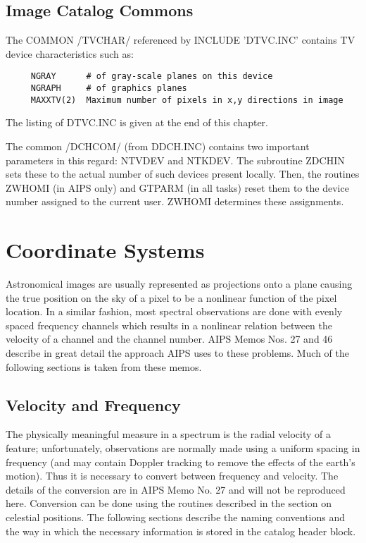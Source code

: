 \subsection{Image Catalog Commons}
The COMMON /TVCHAR/ referenced by INCLUDE 'DTVC.INC' contains TV
device characteristics such as:
\begin{verbatim}
     NGRAY      # of gray-scale planes on this device
     NGRAPH     # of graphics planes
     MAXXTV(2)  Maximum number of pixels in x,y directions in image

\end{verbatim}
The listing of DTVC.INC is given at the end of this chapter.

The common /DCHCOM/ (from DDCH.INC) contains two important parameters
in this regard: NTVDEV and NTKDEV.  The subroutine ZDCHIN sets these
to the actual number of such devices present locally.  Then, the
routines ZWHOMI (in AIPS only) and GTPARM (in all tasks) reset them to
the device number assigned to the current user.  ZWHOMI determines
these assignments.

\section{Coordinate Systems}
Astronomical images are usually represented as projections onto a
plane causing the true position on the sky of a pixel to be a
nonlinear function of the pixel location.  In a similar fashion, most
spectral observations are done with evenly spaced frequency channels
which results in a nonlinear relation between the velocity of a
channel and the channel number.  AIPS Memos Nos. 27 and 46 describe in
great detail the approach AIPS uses to these problems.  Much of the
following sections is taken from these memos.


\subsection{Velocity and Frequency}
The physically meaningful measure in a spectrum is the radial velocity
of a feature; unfortunately, observations are normally made using a
uniform spacing in frequency (and may contain Doppler tracking to
remove the effects of the earth's motion).  Thus it is necessary to
convert between frequency and velocity.  The details of the conversion
are in AIPS Memo No. 27 and will not be reproduced here.  Conversion
can be done using the routines described in the section on celestial
positions. The following sections describe the naming conventions and
the way in which the necessary information is stored in the catalog
header block.

